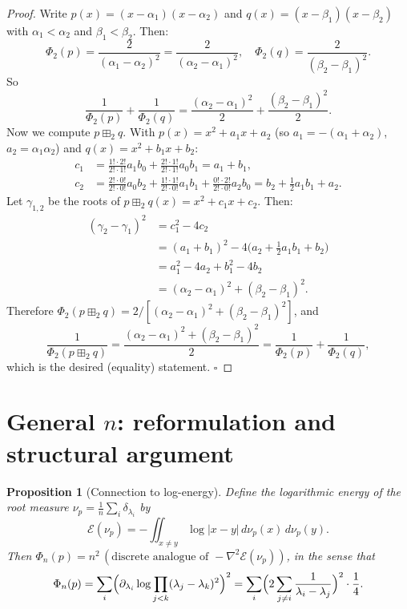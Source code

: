\documentclass[12pt]{article}
\newtheorem{proposition}[theorem]{Proposition}
\begin{document}
\begin{proof}
Write $p(x) = (x-\alpha_1)(x-\alpha_2)$ and $q(x) = (x-\beta_1)(x-\beta_2)$ with $\alpha_1 < \alpha_2$ and $\beta_1 < \beta_2$.  Then:
\[
  \Phi_2(p) = \frac{2}{(\alpha_1-\alpha_2)^2} = \frac{2}{(\alpha_2-\alpha_1)^2}, \quad
  \Phi_2(q) = \frac{2}{(\beta_2-\beta_1)^2}.
\]
So
\[
  \frac{1}{\Phi_2(p)} + \frac{1}{\Phi_2(q)} = \frac{(\alpha_2-\alpha_1)^2}{2} + \frac{(\beta_2-\beta_1)^2}{2}.
\]
Now we compute $p \boxplus_2 q$.  With $p(x)=x^2+a_1 x+a_2$ (so $a_1 = -(\alpha_1+\alpha_2)$, $a_2=\alpha_1\alpha_2$) and $q(x)=x^2+b_1 x+b_2$:
\begin{align*}
  c_1 &= \frac{1!\cdot 2!}{2!\cdot 1!}a_1 b_0 + \frac{2!\cdot 1!}{2!\cdot 1!}a_0 b_1 = a_1 + b_1,\\
  c_2 &= \frac{2!\cdot 0!}{2!\cdot 0!}a_0 b_2 + \frac{1!\cdot 1!}{2!\cdot 0!}a_1 b_1 + \frac{0!\cdot 2!}{2!\cdot 0!}a_2 b_0
       = b_2 + \tfrac12 a_1 b_1 + a_2.
\end{align*}
Let $\gamma_{1,2}$ be the roots of $p\boxplus_2 q(x) = x^2 + c_1 x + c_2$.  Then:
\begin{align*}
  (\gamma_2-\gamma_1)^2 &= c_1^2 - 4c_2 \\
  &= (a_1+b_1)^2 - 4\bigl(a_2 + \tfrac12 a_1 b_1 + b_2\bigr) \\
  &= a_1^2 - 4a_2 + b_1^2 - 4b_2 \\
  &= (\alpha_2-\alpha_1)^2 + (\beta_2-\beta_1)^2.
\end{align*}
Therefore $\Phi_2(p\boxplus_2 q) = 2/[(\alpha_2-\alpha_1)^2+(\beta_2-\beta_1)^2]$, and
\[
  \frac{1}{\Phi_2(p\boxplus_2 q)} = \frac{(\alpha_2-\alpha_1)^2+(\beta_2-\beta_1)^2}{2}
  = \frac{1}{\Phi_2(p)} + \frac{1}{\Phi_2(q)},
\]
which is the desired (equality) statement. \hfill$\square$
\end{proof}

\section*{General $n$: reformulation and structural argument}

\begin{proposition}[Connection to log-energy]
  \label{prop:energy}
  Define the \emph{logarithmic energy} of the root measure $\nu_p = \frac{1}{n}\sum_i \delta_{\lambda_i}$ by
  \[
    \mathcal{E}(\nu_p) = -\iint_{x\neq y}\log|x-y|\,d\nu_p(x)\,d\nu_p(y).
  \]
  Then $\Phi_n(p) = n^2\,(\text{discrete analogue of } -\nabla^2 \mathcal{E}(\nu_p))$, in the sense that
  \[
    \Phi_n(p) = \sum_{i}\Bigl(\partial_{\lambda_i}\log\prod_{j<k}(\lambda_j-\lambda_k)^2\Bigr)^2
    = \sum_i \Bigl(2\sum_{j\neq i}\frac{1}{\lambda_i-\lambda_j}\Bigr)^2 \cdot \frac{1}{4}.
  \]
\end{proposition}
\end{document}
